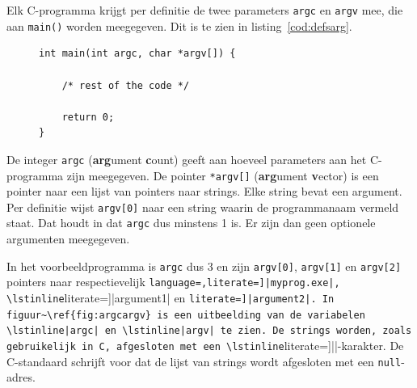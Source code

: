 \documentclass[a4paper,10pt,fleqn,twoside]{article}
\begin{document}
Elk C-programma krijgt per definitie de twee parameters \lstinline|argc| en \lstinline|argv| mee, die aan \lstinline|main()| worden meegegeven. Dit is te zien in listing~\ref{cod:defsarg}.

\begin{figure}[!ht]
\begin{lstlisting}[caption=Declaratie van de command line parameters.,label=cod:defsarg]
int main(int argc, char *argv[]) {
	
	/* rest of the code */
	
	return 0;
}
\end{lstlisting}
\end{figure}

De integer \lstinline|argc| (\textbf{arg}ument \textbf{c}ount) geeft aan hoeveel parameters aan het C-programma zijn meegegeven. De pointer \lstinline|*argv[]| (\textbf{arg}ument \textbf{v}ector) is  een pointer naar een lijst van pointers naar strings. Elke string bevat een argument. Per definitie wijst \lstinline|argv[0]| naar een string waarin de programmanaam vermeld staat. Dat houdt in dat \lstinline|argc| dus minstens 1 is. Er zijn dan geen optionele argumenten meegegeven.

In het voorbeeldprogramma is \lstinline|argc| dus 3 en zijn \lstinline|argv[0]|, \lstinline|argv[1]| en \lstinline|argv[2]| pointers naar respectievelijk \lstinline[language=,literate=]|myprog.exe|, \lstinline[literate=]|argument1| en \lstinline[literate=]|argument2|. In figuur~\ref{fig:argcargv} is een uitbeelding van de variabelen \lstinline|argc| en \lstinline|argv| te zien. De strings worden, zoals gebruikelijk in C, afgesloten met een \lstinline[literate=]|\0|-karakter. De C-standaard schrijft voor dat de lijst van strings wordt afgesloten met een \lstinline|null|-adres.

\end{document}
